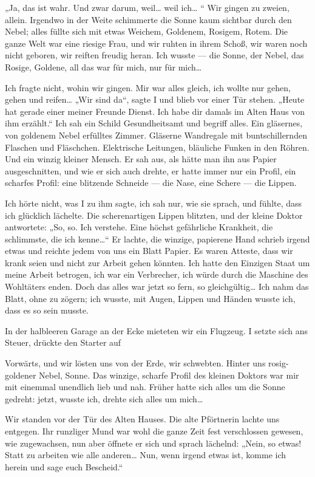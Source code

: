 „Ja, das ist wahr. Und zwar darum, weil\ldots{} weil ich\ldots{} “ Wir gingen
zu zweien, allein. Irgendwo in der Weite schimmerte die Sonne kaum
sichtbar durch den Nebel; alles füllte sich mit etwas Weichem,
Goldenem, Rosigem, Rotem. Die ganze Welt war eine riesige Frau, und
wir ruhten in ihrem Schoß, wir waren noch nicht geboren, wir
reiften freudig heran. Ich wusste — die Sonne, der Nebel, das
Rosige, Goldene, all das war für mich, nur für mich\ldots{}

Ich fragte nicht, wohin wir gingen. Mir war alles gleich, ich
wollte nur gehen, gehen und reifen\ldots{} „Wir sind da“, sagte I und
blieb vor einer Tür stehen. „Heute hat gerade einer meiner Freunde
Dienst. Ich habe dir damals im Alten Haus von ihm erzählt.“ Ich sah
ein Schild Gesundheitsamt und begriff alles. Ein gläsernes, von
goldenem Nebel erfülltes Zimmer. Gläserne Wandregale mit
buntschillernden Flaschen und Fläschchen. Elektrische Leitungen,
bläuliche Funken in den Röhren. Und ein winzig kleiner Mensch. Er
sah aus, als hätte man ihn aus Papier ausgeschnitten, und wie er
sich auch drehte, er hatte immer nur ein Profil, ein scharfes
Profil: eine blitzende Schneide — die Nase, eine Schere — die
Lippen.

Ich hörte nicht, was I zu ihm sagte, ich sah nur, wie sie sprach,
und fühlte, dass ich glücklich lächelte. Die scherenartigen Lippen
blitzten, und der kleine Doktor antwortete: „So, so. Ich verstehe.
Eine höchst gefährliche Krankheit, die schlimmste, die ich
kenne\ldots{}“ Er lachte, die winzige, papierene Hand schrieb irgend
etwas und reichte jedem von uns ein Blatt Papier. Es waren Atteste,
dass wir krank seien und nicht zur Arbeit gehen könnten. Ich hatte
den Einzigen Staat um meine Arbeit betrogen, ich war ein
Verbrecher, ich würde durch die Maschine des Wohltäters enden. Doch
das alles war jetzt so fern, so gleichgültig\ldots{} Ich nahm das Blatt,
ohne zu zögern; ich wusste, mit Augen, Lippen und Händen wusste
ich, dass es so sein musste.

In der halbleeren Garage an der Ecke mieteten wir ein Flugzeug. I
setzte sich ans Steuer, drückte den Starter auf

Vorwärts, und wir lösten uns von der Erde, wir schwebten. Hinter
uns rosig-goldener Nebel, Sonne. Das winzige, scharfe Profil des
kleinen Doktors war mir mit einemmal unendlich lieb und nah. Früher
hatte sich alles um die Sonne gedreht: jetzt, wusste ich, drehte
sich alles um mich\ldots{}

Wir standen vor der Tür des Alten Hauses. Die alte Pförtnerin
lachte uns entgegen. Ihr runzliger Mund war wohl die ganze Zeit
fest verschlossen gewesen, wie zugewachsen, nun aber öffnete er
sich und sprach lächelnd: „Nein, so etwas! Statt zu arbeiten wie
alle anderen\ldots{} Nun, wenn irgend etwas ist, komme ich herein und
sage euch Bescheid.“

